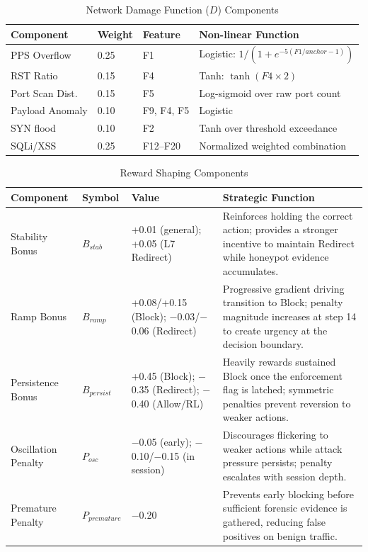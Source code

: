 \documentclass[12pt,a4paper]{report}
\begin{document}
\begin{table}[htbp]
\centering
\caption{Network Damage Function ($D$) Components}
\label{tab:damage_components}
\begin{tabular}{L{4cm} C{1.5cm} L{3cm} L{5.5cm}}
\toprule
\textbf{Component} & \textbf{Weight} & \textbf{Feature} & \textbf{Non-linear Function} \\
\midrule
PPS Overflow & 0.25 & F1 & Logistic: $1/(1+e^{-5(F1/anchor - 1)})$ \\
RST Ratio & 0.15 & F4 & Tanh: $\tanh(F4 \times 2)$ \\
Port Scan Dist. & 0.15 & F5 & Log-sigmoid over raw port count \\
Payload Anomaly & 0.10 & F9, F4, F5 & Logistic \\
SYN flood & 0.10 & F2 & Tanh over threshold exceedance \\
SQLi/XSS & 0.25 & F12–F20 & Normalized weighted combination \\
\bottomrule
\end{tabular}
\end{table}

\begin{table}[htbp]
\centering
\caption{Reward Shaping Components}
\label{tab:shaping_components}
\begin{tabular}{L{3cm} L{1.5cm} L{3cm} L{6.5cm}}
\toprule
\textbf{Component} & \textbf{Symbol} & \textbf{Value} & \textbf{Strategic Function} \\
\midrule
Stability Bonus & $B_{stab}$ & +0.01 (general); +0.05 (L7 Redirect) & Reinforces holding the correct action; provides a stronger incentive to maintain Redirect while honeypot evidence accumulates. \\
Ramp Bonus & $B_{ramp}$ & +0.08/+0.15 (Block); $-$0.03/$-$0.06 (Redirect) & Progressive gradient driving transition to Block; penalty magnitude increases at step 14 to create urgency at the decision boundary. \\
Persistence Bonus & $B_{persist}$ & +0.45 (Block); $-$0.35 (Redirect); $-$0.40 (Allow/RL) & Heavily rewards sustained Block once the enforcement flag is latched; symmetric penalties prevent reversion to weaker actions. \\
Oscillation Penalty & $P_{osc}$ & $-$0.05 (early); $-$0.10/$-$0.15 (in session) & Discourages flickering to weaker actions while attack pressure persists; penalty escalates with session depth. \\
Premature Penalty & $P_{premature}$ & $-$0.20 & Prevents early blocking before sufficient forensic evidence is gathered, reducing false positives on benign traffic. \\
\bottomrule
\end{tabular}
\end{table}
\end{document}
